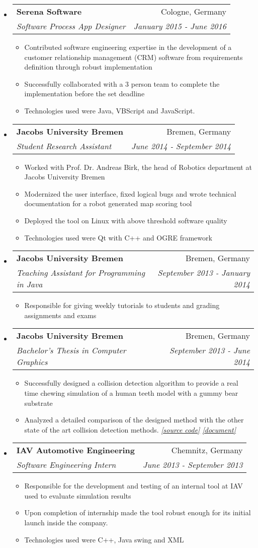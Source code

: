 \documentclass[letterpaper,11pt]{article}
\makeatletter
\newcommand{\resitem}[1]{\item #1 \vspace{-2pt}}
\newcommand{\ressubheading}[4]{
	\begin{tabular*}{6.5in}{l@{\cftdotfill{\cftsecdotsep}\extracolsep{\fill}}r}
		\textbf{#1} & #2 \\
		\textit{#3} & \textit{#4} \\
	\end{tabular*}\vspace{-6pt}}
\makeatother
\begin{document}
\begin{itemize}
		\item
		\ressubheading{Serena Software}{Cologne, Germany}{Software Process App Designer}{ January 2015 - June 2016}
		\begin{itemize}
			\resitem{Contributed software engineering expertise in the development of a customer relationship management
				(CRM) software from requirements definition through robust implementation}
			\resitem{Successfully collaborated with a 3 person team to complete the implementation before the set deadline}
			\resitem{Technologies used were Java, VBScript and JavaScript.}
		\end{itemize}
		
		\item
		\ressubheading{Jacobs University Bremen}{Bremen, Germany}{Student Research Assistant}{ June 2014 - September 2014}
		\begin{itemize}
			\resitem{Worked with Prof. Dr. Andreas Birk, the head of Robotics department at Jacobs University Bremen}
			\resitem{Modernized the user interface, fixed logical bugs and wrote technical documentation for a robot
				generated map scoring tool}
			\resitem{Deployed the tool on Linux with above threshold software quality}
			\resitem{Technologies used were Qt with C++ and OGRE framework}
		\end{itemize}
		
		\item
		\ressubheading{Jacobs University Bremen}{Bremen, Germany}{Teaching Assistant for Programming in Java}{September 2013 - January 2014}
		\begin{itemize}
			\resitem{Responsible for giving weekly tutorials to students and grading assignments and exams}
		\end{itemize}
		
		\item
		\ressubheading{Jacobs University Bremen}{Bremen, Germany}{Bachelor’s Thesis in Computer Graphics}{September 2013 - June 2014}
		\begin{itemize}
			\resitem{Successfully designed a collision detection algorithm to provide a real time chewing simulation of a
				human teeth model with a gummy bear substrate}
			\resitem{Analyzed a detailed comparison of the designed method with the other state of the art collision
				detection methods. \textcolor{gray}{\textit{\href{https://github.com/musaeed/Distance-field/tree/master/src}{[source code]} \href{https://github.com/musaeed/Distance-field/tree/master/src}{[document]}}}}
		\end{itemize}
		
		\item
		\ressubheading{IAV Automotive Engineering}{Chemnitz, Germany}{Software Engineering Intern}{June 2013 - September 2013}
		\begin{itemize}
			\resitem{Responsible for the development and testing of an internal tool at IAV used to evaluate simulation
				results}
			\resitem{Upon completion of internship made the tool robust enough for its initial launch inside the company.}
			\resitem{Technologies used were C++, Java swing and XML}
		\end{itemize}
		
	\end{itemize}
	
\end{document}
